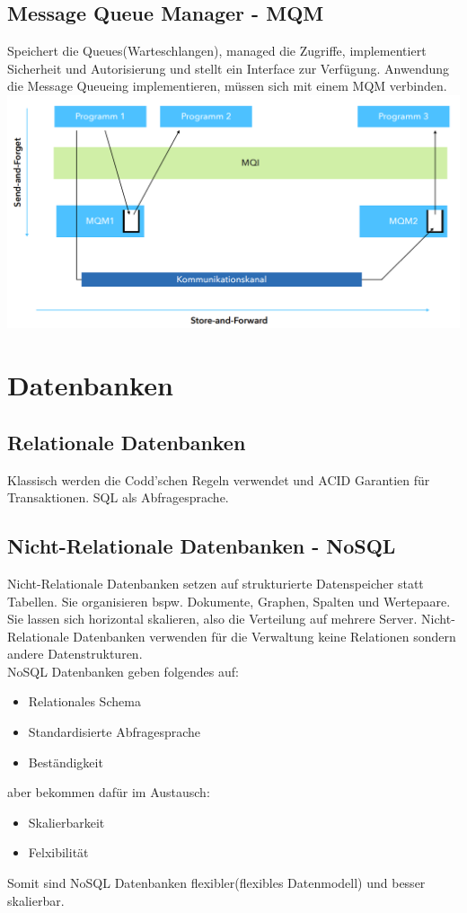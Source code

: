 \documentclass[12pt,a4paper]{article}
\begin{document}
\subsection{Message Queue Manager - MQM}
Speichert die Queues(Warteschlangen), managed die Zugriffe, implementiert Sicherheit und Autorisierung und stellt ein Interface zur Verfügung. Anwendung die Message Queueing implementieren, müssen sich mit einem MQM verbinden.\\
\includegraphics[width=\textwidth]{Bilder/message_queueing.PNG}

\section{Datenbanken}
\subsection{Relationale Datenbanken}
Klassisch werden die Codd'schen Regeln verwendet und ACID Garantien für Transaktionen. SQL als Abfragesprache. 

\subsection{Nicht-Relationale Datenbanken - NoSQL}
Nicht-Relationale Datenbanken setzen auf strukturierte Datenspeicher statt Tabellen. Sie organisieren bspw. Dokumente, Graphen, Spalten und Wertepaare. Sie lassen sich horizontal skalieren, also die Verteilung auf mehrere Server. Nicht-Relationale Datenbanken verwenden für die Verwaltung keine Relationen sondern andere Datenstrukturen.\\
NoSQL Datenbanken geben folgendes auf:
\begin{itemize}
	\item Relationales Schema
	\item Standardisierte Abfragesprache
	\item Beständigkeit
\end{itemize}
aber bekommen dafür im Austausch:
\begin{itemize}
	\item Skalierbarkeit
	\item Felxibilität
\end{itemize}
Somit sind NoSQL Datenbanken flexibler(flexibles Datenmodell) und besser skalierbar. 
\end{document}
